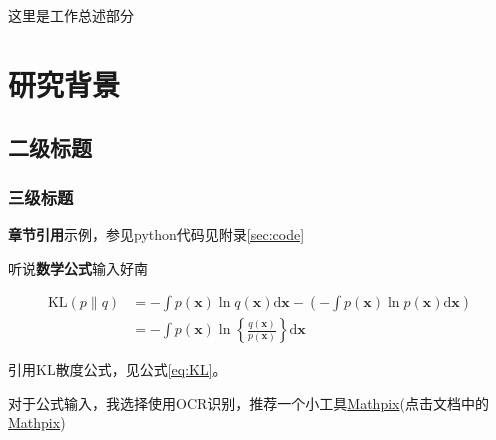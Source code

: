 \documentclass[AutoFakeBold]{fdureport}
\begin{document}
\renewcommand\listfigurename{插\ 图\ 目\ 录}
\renewcommand\listtablename{表\ 格\ 目\ 录}
\listoffigures
{}
\listoftables
\mainmatter

\Intro
这里是工作总述部分


\chapter{研究背景}
\section{二级标题}
\subsection{三级标题}
\par \textbf{章节引用}示例，参见python代码见附录\ref{sec:code}
\par 听说\textbf{数学公式}输入好南

\begin{equation}
\begin{aligned}
\mathrm{KL}(p \| q) &=-\int p(\boldsymbol{x}) \ln q(\boldsymbol{x}) \mathrm{d} \boldsymbol{x}-\left(-\int p(\boldsymbol{x}) \ln p(\boldsymbol{x}) \mathrm{d} \boldsymbol{x}\right) \\
&=-\int p(\boldsymbol{x}) \ln \left\{\frac{q(\boldsymbol{x})}{p(\boldsymbol{x})}\right\} \mathrm{d} \boldsymbol{x}
\end{aligned}
\label{eq:KL}
\end{equation}

\par 引用KL散度公式，见公式\ref{eq:KL}。

\par 对于公式输入，我选择使用OCR识别，推荐一个小工具\href{https://accounts.mathpix.com/signup?referral_code=8ZTrrDwYv3}{Mathpix}(点击文档中的\href{https://accounts.mathpix.com/signup?referral_code=8ZTrrDwYv3}{Mathpix})
\end{document}
